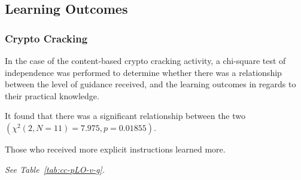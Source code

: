     







    \subsection{Learning Outcomes}















        \subsubsection*{Crypto Cracking}







            In the case of the content-based crypto cracking activity, a chi-square test of independence was performed to determine whether there was a relationship between the level of guidance received, and the learning outcomes in regards to their practical knowledge. %







It found that there was a significant relationship between the two $(\chi^2(2, N=11)=7.975,  p = 0.01855)$. %







Those who received more explicit instructions learned more. %







\emph{See Table~\ref{tab:cc-pLO-v-g}.}















